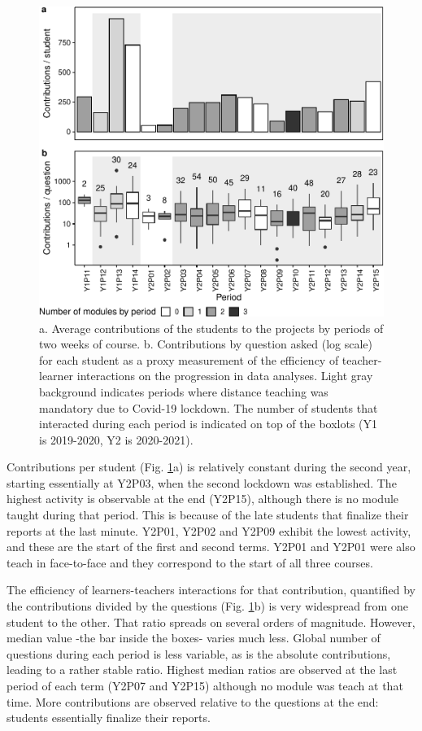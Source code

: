 \documentclass{aims}
\theoremstyle{definition}
\begin{document}
\begin{figure}
\includegraphics[width=1\linewidth]{teaching_data_science_files/figure-latex/fig_support_by_time-1} \caption{\label{fig:fig_support_by_time} a. Average contributions of the students to the projects by periods of two weeks of course. b. Contributions by question asked (log scale) for each student as a proxy measurement of the efficiency of teacher-learner interactions on the progression in data analyses. Light gray background indicates periods where distance teaching was mandatory due to Covid-19 lockdown. The number of students that interacted during each period is indicated on top of the boxlots (Y1 is 2019-2020, Y2 is 2020-2021).}\label{fig:fig_support_by_time}
\end{figure}

Contributions per student (Fig. \ref {fig:fig_support_by_time}a) is
relatively constant during the second year, starting essentially at
Y2P03, when the second lockdown was established. The highest activity is
observable at the end (Y2P15), although there is no module taught during
that period. This is because of the late students that finalize their
reports at the last minute. Y2P01, Y2P02 and Y2P09 exhibit the lowest
activity, and these are the start of the first and second terms. Y2P01
and Y2P01 were also teach in face-to-face and they correspond to the
start of all three courses.

The efficiency of learners-teachers interactions for that contribution,
quantified by the contributions divided by the questions (Fig.
\ref {fig:fig_support_by_time}b) is very widespread from one student to
the other. That ratio spreads on several orders of magnitude. However,
median value -the bar inside the boxes- varies much less. Global number
of questions during each period is less variable, as is the absolute
contributions, leading to a rather stable ratio. Highest median ratios
are observed at the last period of each term (Y2P07 and Y2P15) although
no module was teach at that time. More contributions are observed
relative to the questions at the end: students essentially finalize
their reports.
\end{document}
